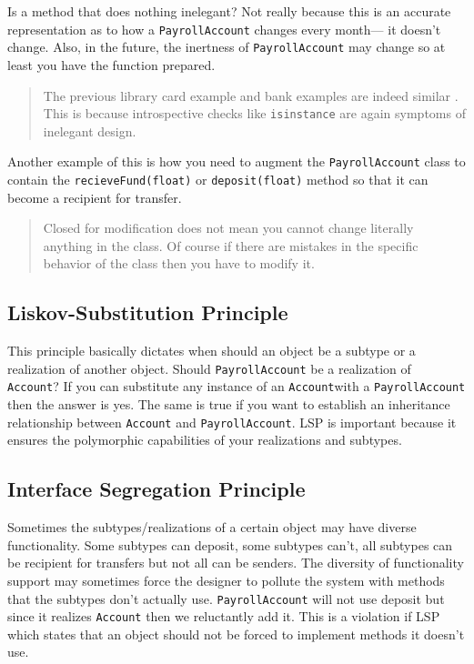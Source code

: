 Is a method that does nothing inelegant? Not really because this is an
accurate representation as to how a \texttt{PayrollAccount} changes
every month--- it doesn't change. Also, in the future, the inertness of
\texttt{PayrollAccount} may change so at least you have the function
prepared.

\begin{quote}
The previous library card example and bank examples are indeed similar .
This is because introspective checks like \texttt{isinstance} are again
symptoms of inelegant design.
\end{quote}

Another example of this is how you need to augment the
\texttt{PayrollAccount} class to contain the \texttt{recieveFund(float)}
or \texttt{deposit(float)} method so that it can become a recipient for
transfer.

\begin{quote}
Closed for modification does not mean you cannot change literally
anything in the class. Of course if there are mistakes in the specific
behavior of the class then you have to modify it.
\end{quote}

\subsection{Liskov-Substitution
Principle}\label{solid-objects.md__liskov-substitution-principle}

This principle basically dictates when should an object be a subtype or
a realization of another object. Should \texttt{PayrollAccount} be a
realization of \texttt{Account}? If you can substitute any instance of
an \texttt{Account}with a \texttt{PayrollAccount} then the answer is
yes. The same is true if you want to establish an inheritance
relationship between \texttt{Account} and \texttt{PayrollAccount}. LSP
is important because it ensures the polymorphic capabilities of your
realizations and subtypes.

\subsection{Interface Segregation
Principle}\label{solid-objects.md__interface-segregation-principle}

Sometimes the subtypes/realizations of a certain object may have diverse
functionality. Some subtypes can deposit, some subtypes can't, all
subtypes can be recipient for transfers but not all can be senders. The
diversity of functionality support may sometimes force the designer to
pollute the system with methods that the subtypes don't actually use.
\texttt{PayrollAccount} will not use deposit but since it realizes
\texttt{Account} then we reluctantly add it. This is a violation if LSP
which states that an object should not be forced to implement methods it
doesn't use.


